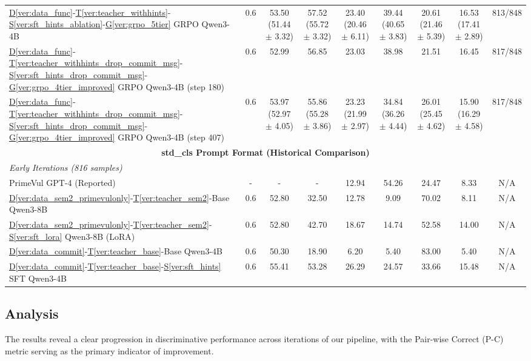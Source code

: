 \documentclass[12pt,a4paper]{article}
\newcommand{\vcode}[4]{\hyperref[#1]{D\ref*{#1}}-\hyperref[#2]{T\ref*{#2}}-\hyperref[#3]{S\ref*{#3}}-\hyperref[#4]{G\ref*{#4}}}
\newcommand{\vcodeSFT}[3]{\hyperref[#1]{D\ref*{#1}}-\hyperref[#2]{T\ref*{#2}}-\hyperref[#3]{S\ref*{#3}}}
\newcommand{\vcodeBase}[2]{\hyperref[#1]{D\ref*{#1}}-\hyperref[#2]{T\ref*{#2}}-Base}
\begin{document}
\begin{table}[H]
\begin{minipage}{\paperwidth}
{\begin{tabular}{lcccccccc}
\vcode{ver:data_func}{ver:teacher_withhints}{ver:sft_hints_ablation}{ver:grpo_5tier} GRPO Qwen3-4B & 0.6 & 53.50 (51.44 $\pm$ 3.32) & 57.52 (55.72 $\pm$ 3.32) & 23.40 (20.46 $\pm$ 6.11) & 39.44 (40.65 $\pm$ 3.83) & 20.61 (21.46 $\pm$ 5.39) & 16.53 (17.41 $\pm$ 2.89) & 813/848 \\
\vcode{ver:data_func}{ver:teacher_withhints_drop_commit_msg}{ver:sft_hints_drop_commit_msg}{ver:grpo_4tier_improved} GRPO Qwen3-4B (step 180) & 0.6 & 52.99 & 56.85 & 23.03 & 38.98 & 21.51 & 16.45 & 817/848 \\
\vcode{ver:data_func}{ver:teacher_withhints_drop_commit_msg}{ver:sft_hints_drop_commit_msg}{ver:grpo_4tier_improved} GRPO Qwen3-4B (step 407) & 0.6 & 53.97 (52.97 $\pm$ 4.05) & 55.86 (55.28 $\pm$ 3.86) & 23.23 (21.99 $\pm$ 2.97) & 34.84 (36.26 $\pm$ 4.44) & 26.01 (25.45 $\pm$ 4.62) & 15.90 (16.29 $\pm$ 4.58) & 817/848 \\
\midrule
\multicolumn{9}{c}{\textbf{std\_cls Prompt Format (Historical Comparison)}} \\
\midrule
\multicolumn{9}{l}{\textit{Early Iterations (816 samples)}} \\
PrimeVul GPT-4 (Reported) & - & - & - & 12.94 & 54.26 & 24.47 & 8.33 & N/A \\
\vcodeBase{ver:data_sem2_primevulonly}{ver:teacher_sem2} Qwen3-8B & 0.6 & 52.80 & 32.50 & 12.78 & 9.09 & 70.02 & 8.11 & N/A \\
\vcodeSFT{ver:data_sem2_primevulonly}{ver:teacher_sem2}{ver:sft_lora} Qwen3-8B (LoRA) & 0.6 & 52.80 & 42.70 & 18.67 & 14.74 & 52.58 & 14.00 & N/A \\
\midrule
\vcodeBase{ver:data_commit}{ver:teacher_base} Qwen3-4B & 0.6 & 50.30 & 18.90 & 6.20 & 5.40 & 83.00 & 5.40 & N/A \\
\vcodeSFT{ver:data_commit}{ver:teacher_base}{ver:sft_hints} SFT Qwen3-4B & 0.6 & 55.41 & 53.28 & 26.29 & 24.57 & 33.66 & 15.48 & N/A \\
\bottomrule
\end{tabular}%
}
\end{minipage}
\end{table}

\subsection{Analysis}\label{sec:analysis}

The results reveal a clear progression in discriminative performance across iterations of our pipeline, with the Pair-wise Correct (P-C) metric serving as the primary indicator of improvement.
\end{document}
